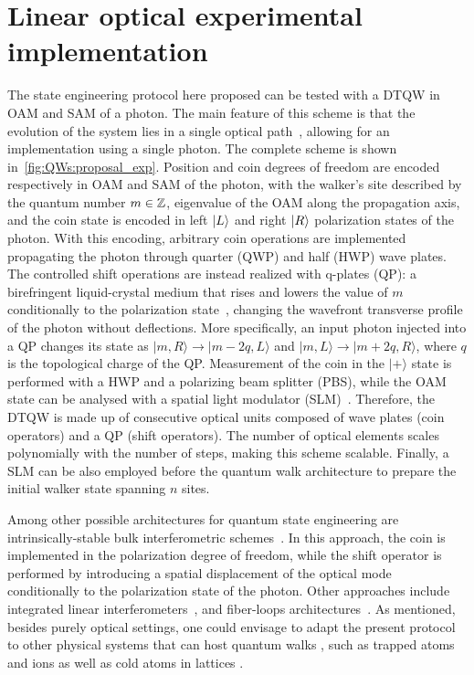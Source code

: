 \section{Linear optical experimental implementation}
The state engineering protocol here proposed can be tested with a DTQW in \ac{OAM} and \ac{SAM} of a photon.
The main feature of this scheme is that the evolution of the system lies in a single optical path~\cite{zhang2010implementation}, allowing for an implementation using a single photon.
The complete scheme is shown in~\cref{fig:QWs:proposal_exp}.
Position and coin degrees of freedom are encoded respectively in \ac{OAM} and \ac{SAM} of the photon,
with the walker's site described by the quantum number $m\in\mathbb{Z}$, eigenvalue of the \ac{OAM} along the propagation axis, and the coin state is encoded in left $\ket L$ and right $\ket R$ polarization states of the photon.
With this encoding, arbitrary coin operations are implemented propagating the photon through quarter (QWP) and half (HWP) wave plates.
The controlled shift operations are instead realized with q-plates (QP):
a birefringent liquid-crystal medium that rises and lowers the value of $m$ conditionally to the polarization state~\cite{marrucci2006optical},
changing the wavefront transverse profile of the photon without deflections.
More specifically, an input photon injected into a QP changes its state as $\vert m,R \rangle \rightarrow \vert m-2q,L \rangle$ and $\vert m,L \rangle \rightarrow \vert m+2q,R \rangle$, where $q$ is the topological charge of the QP.
Measurement of the coin in the $\vert + \rangle$ state is performed with a HWP and a polarizing beam splitter (PBS),
while the OAM state can be analysed with a spatial light modulator (SLM)~\cite{cardano2015quantum}.
Therefore, the DTQW is made up of consecutive optical units composed of wave plates (coin operators) and a QP (shift operators).
The number of optical elements scales polynomially with the number of steps, making this scheme scalable.
Finally, a SLM can be also employed before the quantum walk architecture to prepare the initial walker state spanning $n$ sites.

Among other possible architectures for quantum state engineering are intrinsically-stable bulk interferometric schemes~\cite{broome2010discrete,kitagawa2012observation,vitelli2013joining}.
In this approach, the coin is implemented in the polarization degree of freedom,
while the shift operator is performed by introducing a spatial displacement of the optical mode conditionally to the polarization state of the photon.
Other approaches include integrated linear interferometers~\cite{sansoni2012twoparticle, crespi2013anderson, harris2015bosonic, pitsios2016photonic}, and fiber-loops architectures~\cite{schreiber2010photons, schreiber2012a, boutari2016large}. As mentioned, besides purely optical settings, one could envisage to adapt the present protocol to other physical systems that can host quantum walks \cite{manouchehri2014physical}, such as trapped atoms \cite{karski2009quantum} and ions \cite{schmitz2009quantum, zhringer2010realization} as well as cold atoms in lattices \cite{weitenberg2011singlespin, fukuhara2013microscopic, preiss2015strongly}.

